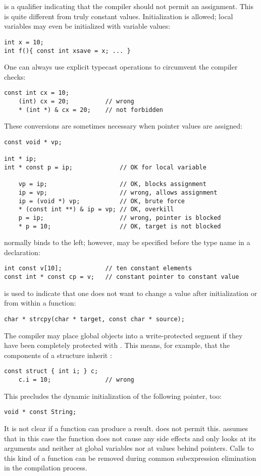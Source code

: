 \section{}
 is a qualifier indicating that the compiler should not permit
an assignment. This is quite different from truly constant values.
Initialization is allowed;  local variables may even be
initialized with variable values:
\begin{lstlisting}
int x = 10;
int f(){ const int xsave = x; ... }
\end{lstlisting}
One can always use explicit typecast operations to circumvent the compiler
checks:
\begin{lstlisting}
const int cx = 10;
	(int) cx = 20;			// wrong
	* (int *) & cx = 20;	// not forbidden
\end{lstlisting}
These conversions are sometimes necessary when pointer values are assigned:
\begin{lstlisting}
const void * vp;

int * ip;
int * const p = ip;				// OK for local variable

	vp = ip;					// OK, blocks assignment
	ip = vp;					// wrong, allows assignment
	ip = (void *) vp;			// OK, brute force
	* (const int **) & ip = vp; // OK, overkill
	p = ip;						// wrong, pointer is blocked
	* p = 10;					// OK, target is not blocked
\end{lstlisting}
 normally binds to the left; however,  may be
specified before the type name in a declaration:
\begin{lstlisting}
int const v[10];			// ten constant elements
const int * const cp = v;	// constant pointer to constant value
\end{lstlisting}
 is used to indicate that one does not want to change a value
after initialization or from within a function:
\begin{lstlisting}
char * strcpy(char * target, const char * source);
\end{lstlisting}
The compiler may place global objects into a write-protected segment if they
have been completely protected with . This means, for example,
that the components of a structure inherit :
\begin{lstlisting}
const struct { int i; } c;
	c.i = 10;				// wrong
\end{lstlisting}
This precludes the dynamic initialization of the following pointer, too:
\begin{lstlisting}
void * const String;
\end{lstlisting}
It is not clear if a function can produce a  result.
 does not permit this.  assumes that in this case
the function does not cause any side effects and only looks at its arguments
and neither at global variables nor at values behind pointers. Calls to this
kind of a function can be removed during common subexpression elimination in
the compilation process.

